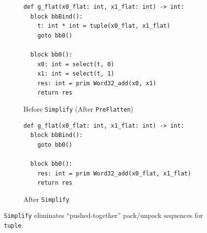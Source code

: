 \begin{figure}[htbp]
  \centering
  \begin{subfigure}[t]{0.48\textwidth}
    \caption{Before \texttt{Simplify} (After \texttt{PreFlatten})}
    \label{fig:simplify_proj_elim_before}
    \vspace{1mm}
\begin{verbatim}
def g_flat(x0_flat: int, x1_flat: int) -> int:
  block bbBind():
    t: int * int = tuple(x0_flat, x1_flat)
    goto bb0()

  block bb0():
    x0: int = select(t, 0)
    x1: int = select(t, 1)
    res: int = prim Word32_add(x0, x1)
    return res
\end{verbatim}
  \end{subfigure}\hfill
  \begin{subfigure}[t]{0.48\textwidth}
    \caption{After \texttt{Simplify}}
    \label{fig:simplify_proj_elim_after}
    \vspace{1mm}
\begin{verbatim}
def g_flat(x0_flat: int, x1_flat: int) -> int:
  block bbBind():
    goto bb0()

  block bb0():
    res: int = prim Word32_add(x0_flat, x1_flat)
    return res
\end{verbatim}
  \end{subfigure}
  
  \caption{\texttt{Simplify} eliminates ``pushed-together'' pack/unpack sequences for \texttt{tuple}.}

  \label{fig:simplify_proj_elim}
\end{figure}

